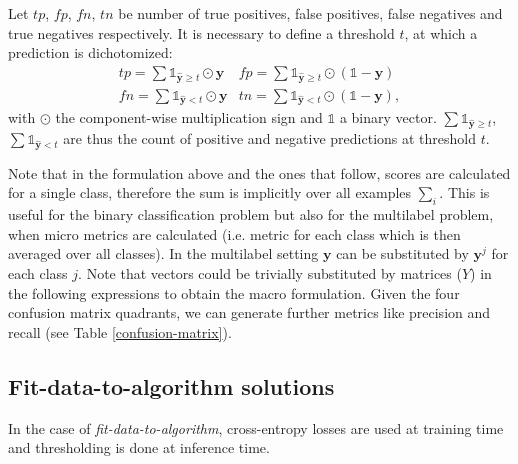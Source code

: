 Let \(tp\), \(fp\), \(fn\), \(tn\) be number of true positives, false positives, false negatives and true negatives respectively. It is necessary to define a threshold \(t\), at which a prediction is dichotomized:
%
\begin{equation}
\label{eq:conf}
\begin{array}{ll} tp = \sum \mathds{1}_{\hat{\mathbf{y}} \geq t} \odot \mathbf{y}  & fp = \sum \mathds{1}_{\hat{\mathbf{y}} \geq t} \odot (\mathds{1} - \mathbf{y}) \\ fn = \sum \mathds{1}_{\hat{\mathbf{y}} < t} \odot \mathbf{y} & tn = \sum \mathds{1}_{\hat{\mathbf{y}} < t} \odot (\mathds{1} - \mathbf{y}),
\end{array}
\end{equation}
%
with \(\odot\) the component-wise multiplication sign and \(\mathds{1}\) a binary vector. \(\sum \mathds{1}_{\hat{\mathbf{y}} \geq t}\), \(\sum \mathds{1}_{\hat{\mathbf{y}} < t}\) are thus the count of positive and negative predictions at threshold \(t\).

Note that in the formulation above and the ones that follow, scores are calculated for a single class, therefore the sum is implicitly over all examples \(\sum_i\). This is useful for the binary classification problem but also for the multilabel problem, when micro metrics are calculated (i.e. metric for each class which is then averaged over all classes).
In the multilabel setting $\mathbf{y}$ can be substituted by $\mathbf{y}^j$ for each class $j$. Note that vectors could be trivially substituted by matrices ($Y$) in the following expressions to obtain the macro formulation.
Given the four confusion matrix quadrants, we can generate further metrics like precision and recall (see Table \ref{confusion-matrix}).


\subsection{Fit-data-to-algorithm solutions}
\label{section:background:fitdata}
In the case of \emph{fit-data-to-algorithm}, cross-entropy losses are used at training time and thresholding is done at inference time.

